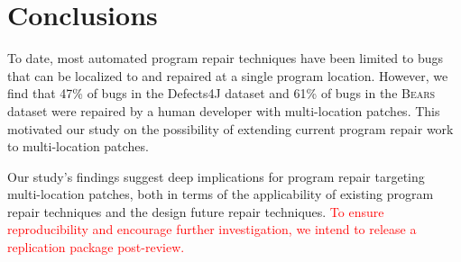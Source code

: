 \documentclass[10pt, conference]{IEEEtran}
\newcommand\todo[1]{\textcolor{red}{#1}}
\newcommand\bears{\textsc{Bears}\xspace}
\begin{document}
\section{Conclusions}
\label{sec:conclusions}

To date, most automated program repair techniques have been limited to bugs that
can be localized to and repaired at a single program location. However, we find
that 47\% of bugs in the Defects4J dataset and 61\% of bugs in the \bears dataset
were repaired by a human developer with multi-location patches. This motivated
our study on the possibility of extending current program repair work to
multi-location patches.

Our study's findings suggest deep implications for program repair targeting
multi-location patches, both in terms of the applicability of existing program
repair techniques and the design future repair techniques. \todo{To ensure
reproducibility and encourage further investigation, we intend to release a
replication package post-review.}



\end{document}
